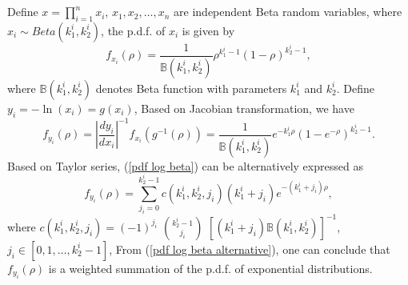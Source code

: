 \documentclass[12pt, draftclsnofoot, onecolumn]{IEEEtran}
\begin{document}
\section{}\label{proof pdf of OM}
Define $x=\prod_{i=1}^{n}x_{i}$,
$x_{1}, x_{2}, \ldots, x_{n}$ are independent Beta random variables, where $x_{i}\sim Beta(k_{1}^{i}, k_{2}^{i})$, the p.d.f. of $x_{i}$ is given by 
\begin{equation}
f_{x_{i}}(\rho)=\frac{1}{\mathbb{B}(k_{1}^{i}, k_{2}^{i})}\rho^{k_{1}^{i}-1}(1-\rho)^{k_{2}^{i}-1},
\label{pdf beta}
\end{equation}
where $\mathbb{B}(k^{i}_{1}, k_{2}^{i})$ denotes Beta function with parameters $k_{1}^{i}$ and $k_{2}^{i}$.
Define $y_{i}=-\ln(x_{i})=g(x_{i})$, Based on Jacobian transformation, we have 
\begin{equation}
f_{y_{i}}(\rho)=|\frac{dy_{i}}{dx_{i}}|^{-1}f_{x_{i}}(g^{-1}(\rho))=\frac{1}{\mathbb{B}(k_{1}^{i},k_{2}^{i})}e^{-k_{1}^{i}\rho}(1-e^{-\rho})^{k_{2}^{i}-1}.
\label{pdf log beta}
\end{equation}
Based on Taylor series, (\ref{pdf log beta}) can be alternatively expressed as \cite{bhargava1981distribution}
\begin{equation}
f_{y_{i}}(\rho)=\sum_{j_{i}=0}^{k_{2}^{i}-1}c(k_{1}^{i},k_{2}^{i}, j_{i})(k_{1}^{i}+j_{i})e^{-(k_{1}^{i}+j_{i})\rho},
\label{pdf log beta alternative}
\end{equation} 
where $c(k_{1}^{i}, k_{2}^{i}, j_{i})=(-1)^{j_{i}}$ $k_{2}^{i}-1\choose j_{i}$ $[(k_{1}^{i}+j_{i})\mathbb{B}(k_{1}^{i},k_{2}^{i})]^{-1}$, $j_{i}\in [0,1,\ldots, k_{2}^{i}-1]$,
From (\ref{pdf log beta alternative}), one can conclude that $f_{y_{i}}(\rho)$ is a weighted summation of the p.d.f. of exponential distributions. 
\end{document}
